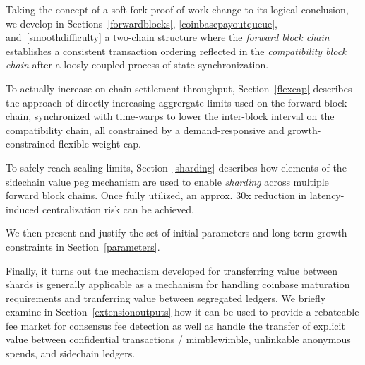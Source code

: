 Taking the concept of a soft-fork proof-of-work change to its logical
conclusion, we develop in Sections~\ref{forwardblocks},
\ref{coinbasepayoutqueue}, and~\ref{smoothdifficulty} a two-chain
structure where the \emph{forward block chain} establishes a
consistent transaction ordering reflected in the \emph{compatibility
  block chain} after a loosly coupled process of state
synchronization.

To actually increase on-chain settlement throughput,
Section~\ref{flexcap} describes the approach of directly increasing
aggrergate limits used on the forward block chain, synchronized with
time-warps to lower the inter-block interval on the compatibility
chain, all constrained by a demand-responsive and growth-constrained
flexible weight cap.

To safely reach scaling limits, Section~\ref{sharding} describes how
elements of the sidechain value peg mechanism are used to enable
\emph{sharding} across multiple forward block chains.  Once fully
utilized, an approx. \num{30}x reduction in latency-induced
centralization risk can be achieved.

We then present and justify the set of initial parameters and
long-term growth constraints in Section~\ref{parameters}.

Finally, it turns out the mechanism developed for transferring value
between shards is generally applicable as a mechanism for handling
coinbase maturation requirements and tranferring value between
segregated ledgers.  We briefly examine in
Section~\ref{extensionoutputs} how it can be used to provide a
rebateable fee market for consensus fee detection as well as handle
the transfer of explicit value between confidential transactions /
mimblewimble, unlinkable anonymous spends, and sidechain ledgers.
